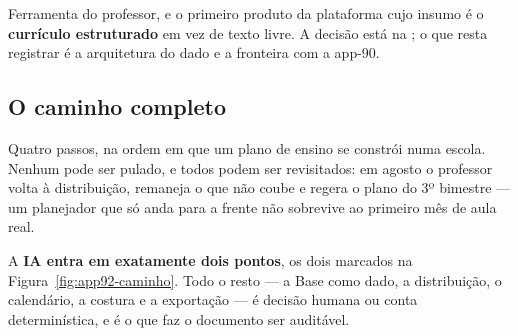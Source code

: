 Ferramenta do professor, e o primeiro produto da plataforma cujo insumo é o
\textbf{currículo estruturado} em vez de texto livre. A decisão está na
; o que resta registrar é a arquitetura do dado e a fronteira com a
app-90.

\subsection{O caminho completo}

Quatro passos, na ordem em que um plano de ensino se constrói numa escola.
Nenhum pode ser pulado, e todos podem ser revisitados: em agosto o professor
volta à distribuição, remaneja o que não coube e regera o plano do 3º bimestre
--- um planejador que só anda para a frente não sobrevive ao primeiro mês de
aula real.

A \textbf{IA entra em exatamente dois pontos}, os dois marcados na
Figura~\ref{fig:app92-caminho}. Todo
o resto --- a Base como dado, a distribuição, o calendário, a costura e a
exportação --- é decisão humana ou conta determinística, e é o que faz o
documento ser auditável.

